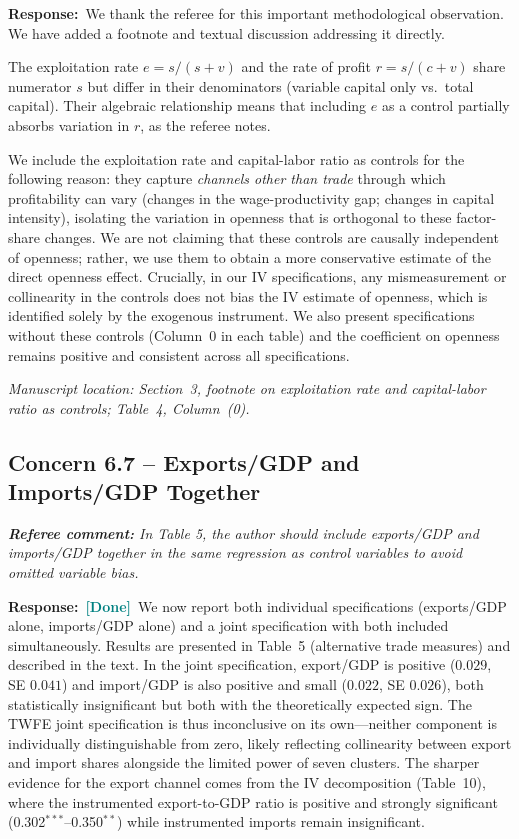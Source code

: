 \documentclass[11pt]{article}
\newcommand{\RC}[1]{\begin{refereebox}\textit{\textbf{Referee comment:} #1}\end{refereebox}}
\newcommand{\AR}{\noindent\textbf{Response:}\ }
\newcommand{\done}{\textcolor{teal}{\textbf{[Done]}}}
\begin{document}
\AR We thank the referee for this important methodological observation. We have added a footnote and textual discussion addressing it directly.

The exploitation rate $e = s/(s+v)$ and the rate of profit $r = s/(c+v)$ share numerator $s$ but differ in their denominators (variable capital only vs.\ total capital). Their algebraic relationship means that including $e$ as a control partially absorbs variation in $r$, as the referee notes.

We include the exploitation rate and capital-labor ratio as controls for the following reason: they capture \emph{channels other than trade} through which profitability can vary (changes in the wage-productivity gap; changes in capital intensity), isolating the variation in openness that is orthogonal to these factor-share changes. We are not claiming that these controls are causally independent of openness; rather, we use them to obtain a more conservative estimate of the direct openness effect. Crucially, in our IV specifications, any mismeasurement or collinearity in the controls does not bias the IV estimate of openness, which is identified solely by the exogenous instrument. We also present specifications without these controls (Column~0 in each table) and the coefficient on openness remains positive and consistent across all specifications.

\smallskip\noindent\textit{Manuscript location: Section~3, footnote on exploitation rate and capital-labor ratio as controls; Table~4, Column~(0).}

\subsection*{Concern 6.7 -- Exports/GDP and Imports/GDP Together}

\RC{In Table 5, the author should include exports/GDP and imports/GDP together in the same regression as control variables to avoid omitted variable bias.}

\AR \done\ We now report both individual specifications (exports/GDP alone, imports/GDP alone) and a joint specification with both included simultaneously. Results are presented in Table~5 (alternative trade measures) and described in the text. In the joint specification, export/GDP is positive ($0.029$, SE $0.041$) and import/GDP is also positive and small ($0.022$, SE $0.026$), both statistically insignificant but both with the theoretically expected sign. The TWFE joint specification is thus inconclusive on its own---neither component is individually distinguishable from zero, likely reflecting collinearity between export and import shares alongside the limited power of seven clusters. The sharper evidence for the export channel comes from the IV decomposition (Table~10), where the instrumented export-to-GDP ratio is positive and strongly significant (0.302$^{***}$--0.350$^{**}$) while instrumented imports remain insignificant.
\end{document}
